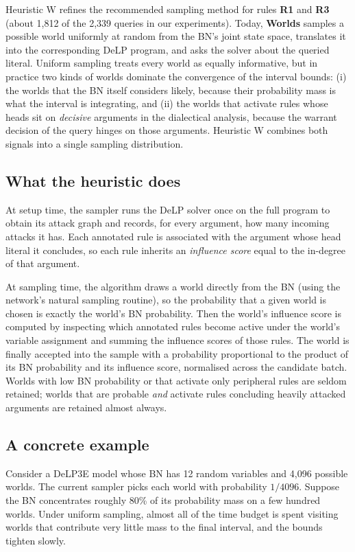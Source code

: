 \documentclass[11pt,a4paper]{article}
\newcommand{\worlds}{\textcolor{worldsblue}{\textbf{Worlds}}}
\begin{document}
Heuristic W refines the recommended sampling method for rules \textbf{R1} and \textbf{R3} (about 1{,}812 of the 2{,}339 queries in our experiments). Today, \worlds{} samples a possible world uniformly at random from the BN's joint state space, translates it into the corresponding DeLP program, and asks the solver about the queried literal. Uniform sampling treats every world as equally informative, but in practice two kinds of worlds dominate the convergence of the interval bounds: (i) the worlds that the BN itself considers likely, because their probability mass is what the interval is integrating, and (ii) the worlds that activate rules whose heads sit on \emph{decisive} arguments in the dialectical analysis, because the warrant decision of the query hinges on those arguments. Heuristic W combines both signals into a single sampling distribution.

\subsection*{What the heuristic does}

At setup time, the sampler runs the DeLP solver once on the full program to obtain its attack graph and records, for every argument, how many incoming attacks it has. Each annotated rule is associated with the argument whose head literal it concludes, so each rule inherits an \emph{influence score} equal to the in-degree of that argument.

At sampling time, the algorithm draws a world directly from the BN (using the network's natural sampling routine), so the probability that a given world is chosen is exactly the world's BN probability. Then the world's influence score is computed by inspecting which annotated rules become active under the world's variable assignment and summing the influence scores of those rules. The world is finally accepted into the sample with a probability proportional to the product of its BN probability and its influence score, normalised across the candidate batch. Worlds with low BN probability or that activate only peripheral rules are seldom retained; worlds that are probable \emph{and} activate rules concluding heavily attacked arguments are retained almost always.

\subsection*{A concrete example}

Consider a DeLP3E model whose BN has 12 random variables and 4{,}096 possible worlds. The current sampler picks each world with probability $1/4096$. Suppose the BN concentrates roughly 80\% of its probability mass on a few hundred worlds. Under uniform sampling, almost all of the time budget is spent visiting worlds that contribute very little mass to the final interval, and the bounds tighten slowly.
\end{document}

